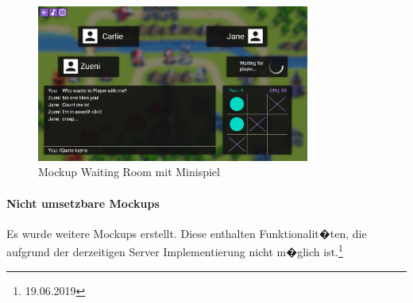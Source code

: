 \documentclass[12pt, titlepage]{scrartcl}
\begin{document}
		\begin{figure}[H] 
			\centering
			\includegraphics[width=0.8\textwidth]{Waiting_Room_Game_With_TTT.png}
			\caption{Mockup Waiting Room mit Minispiel}
			\label{WaitingRoomWithMiniGame}
		\end{figure}
	
		\paragraph{Nicht umsetzbare Mockups}
		Es wurde weitere Mockups erstellt. Diese enthalten Funktionalit�ten, die aufgrund der derzeitigen Server Implementierung nicht m�glich ist.\footnote{19.06.2019}
		
\end{document}
